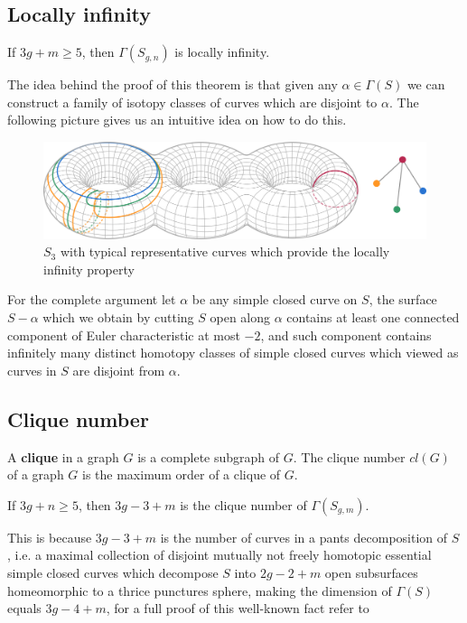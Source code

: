 \subsection{Locally infinity}
\begin{theorem}
If $3g+m\geq 5$, then $\Gamma(S_{g,n})$ is locally infinity.
\end{theorem}
The idea behind the proof of this theorem is that given any $\alpha \in \Gamma(S)$ we can construct a family of isotopy classes of curves which are disjoint to $\alpha$. The following picture gives us an intuitive idea on how to do this.
\vspace{1cm}
\begin{figure}[h!]
	\centering
	\includegraphics[scale=0.5]{Figures/Locally-infinite.png}
	\caption{$S_{3}$ with typical representative curves which provide the locally infinity property}
\end{figure}

For the complete argument let $\alpha$ be any simple closed curve on $S$, the surface $S-\alpha$ which we obtain by cutting $S$ open along $\alpha$ contains at least one connected component of Euler characteristic at most $-2$, and such component contains infinitely many distinct homotopy classes of simple closed curves which viewed as curves in $S$ are disjoint from $\alpha$.

\subsection{Clique number}
A \textbf{clique} in a graph $G$ is a complete subgraph of $G$. The clique number $cl(G)$ of a graph $G$ is the maximum order of a clique of $G$.

\begin{theorem}
If $3g+n\geq 5$, then $3g - 3 + m$ is the clique number of $\Gamma(S_{g,m})$.
\end{theorem}

 This is because $3g-3+m$ is the number of curves in a pants decomposition of $S$, i.e. a maximal collection of disjoint mutually not freely homotopic essential simple closed curves which decompose $S$ into $2g-2+m$ open subsurfaces homeomorphic to a thrice punctures sphere, making the dimension of $\Gamma(S)$ equals $3g-4+m$, for a full proof of this well-known fact refer to \cite[Hatcher]{Pants}
 
